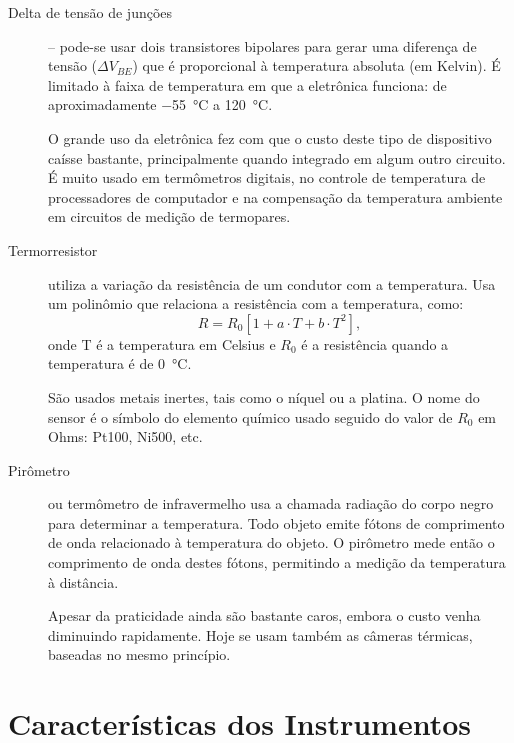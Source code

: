 \begin{description}
\item[Delta de tensão de junções] -- pode-se usar dois transistores bipolares para gerar uma diferença de tensão ($\Delta V_{BE}$) que é proporcional à temperatura absoluta (em Kelvin). É limitado à faixa de temperatura em que a eletrônica funciona: de aproximadamente \SI{-55}{\celsius} a \SI{120}{\celsius}.

O grande uso da eletrônica fez com que o custo deste tipo de dispositivo caísse bastante, principalmente quando integrado em algum outro circuito. É muito usado em termômetros digitais, no controle de temperatura de processadores de computador e na compensação da temperatura ambiente em circuitos de medição de termopares.

  \item[Termorresistor] utiliza a variação da resistência de um condutor com a temperatura. Usa um polinômio que relaciona a resistência com a temperatura, como:
  \[
R = R_0[1+a\cdot T+b\cdot T^2],
  \]
onde T é a temperatura em Celsius e $R_0$ é a resistência quando a temperatura é de \SI{0}{\celsius}.

São usados metais inertes, tais como o níquel ou a platina. O nome do sensor é o símbolo do elemento químico usado seguido do valor de $R_0$ em Ohms: Pt100, Ni500, etc.

\item[Pirômetro] ou termômetro de infravermelho usa a chamada radiação do corpo negro para determinar a temperatura. Todo objeto emite fótons de comprimento de onda relacionado à temperatura do objeto. O pirômetro mede então o comprimento de onda destes fótons, permitindo a medição da temperatura à distância.

Apesar da praticidade ainda são bastante caros, embora o custo venha diminuindo rapidamente. Hoje se usam também as câmeras térmicas, baseadas no mesmo princípio.
\end{description}

\section{Características dos Instrumentos}
\label{sec:Características dos Instrumentos}

